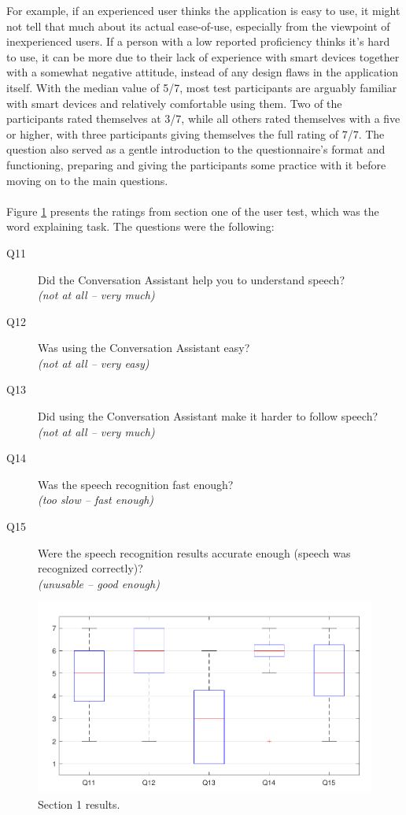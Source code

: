 \documentclass[english, 12pt, a4paper, pdftex, elec, utf8]{aaltothesis}
\begin{document}
For example, if an experienced user thinks the application is easy to use, it might not tell that much about its actual ease-of-use, especially from the viewpoint of inexperienced users. If a person with a low reported proficiency thinks it's hard to use, it can be more due to their lack of experience with smart devices together with a somewhat negative attitude, instead of any design flaws in the application itself. With the median value of 5/7, most test participants are arguably familiar with smart devices and relatively comfortable using them. Two of the participants rated themselves at 3/7, while all others rated themselves with a five or higher, with three participants giving themselves the full rating of 7/7. The question also served as a gentle introduction to the questionnaire's format and functioning, preparing and giving the participants some practice with it before moving on to the main questions. \\\\
Figure \ref{fig:results2} presents the ratings from section one of the user test, which was the word explaining task. The questions were the following:
\begin{description}
	\item[Q11] Did the Conversation Assistant help you to understand speech? \\ \textit{(not at all -- very much)}
	\item[Q12] Was using the Conversation Assistant easy? \\ \textit{(not at all -- very easy)}
	\item[Q13] Did using the Conversation Assistant make it harder to follow speech? \\ \textit{(not at all -- very much)}
	\item[Q14] Was the speech recognition fast enough? \\ \textit{(too slow -- fast enough)}
	\item[Q15] Were the speech recognition results accurate enough (speech was recognized correctly)? \\ \textit{(unusable -- good enough)}
\end{description}
\begin{figure}[h!]
	\centering
	\includegraphics[width=\textwidth]{T2_box2.pdf}
	\caption{Section 1 results.}
	\label{fig:results2} 
\end{figure}
\end{document}

